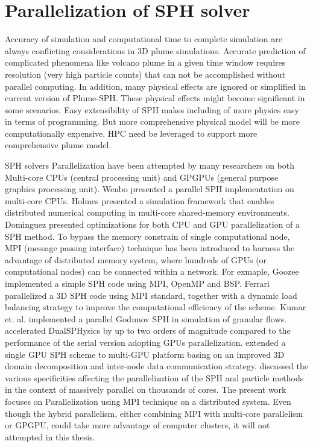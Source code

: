 \section{Parallelization of SPH solver}

Accuracy of simulation and computational time to complete simulation are always conflicting considerations in 3D plume simulations. Accurate prediction of complicated phenomena like volcano plume in a given time window requires resolution (very high particle counts) that can not be accomplished without parallel computing. In addition, many physical effects are ignored or simplified in current version of Plume-SPH. These physical effects might become significant in some scenarios. Easy extensibility of SPH makes including of more physics easy in terms of programming. But more comprehensive physical model will be more computationally expensive. HPC need be leveraged to support more comprehensive plume model.

SPH solvers Parallelization have been attempted by many researchers on both Multi-core CPUs (central processing unit) and GPGPUs (general purpose graphics processing unit). Wenbo \cite{wenbo2014performance} presented a parallel SPH implementation on multi-core CPUs. Holmes \cite{holmes2011framework} presented a simulation framework that enables distributed numerical computing in multi-core shared-memory environments. Dominguez \cite{dominguez2011optimization} presented optimizations for both CPU and GPU parallelization of a SPH method. To bypass the memory constrain of single computational node, MPI (message passing interface) technique has been introduced to harness the advantage of distributed memory system, where hundreds of GPUs (or computational nodes) can be connected within a network. For exmaple, Goozee \cite{goozee2003distributed} implemented a simple SPH code using MPI, OpenMP and BSP. 
Ferrari \cite{ferrari2009new} parallelized a 3D SPH code using MPI standard, together with a dynamic load balancing strategy to improve the computational efficiency of the scheme. Kumar et. al. \cite{kumar2013parallel} implemented a parallel Godunov SPH in simulation of granular flows. \citet{crespo2015dualsphysics} accelerated DualSPHysics by up to two orders of magnitude compared to the performance of the serial version adopting GPUs parallelization. \citet{ji2016large} 
extended a single GPU SPH scheme to multi-GPU platform basing on an improved 3D domain decomposition and inter-node data communication strategy. \citet{oger2016distributed} discussed the various specificities affecting the parallelization of the SPH and particle methods in the context of massively parallel on thousands of cores.
The present work focuses on Parallelization using MPI technique on a distributed system. Even though the hybrid parallelism, either combining MPI with multi-core parallelism or GPGPU, could take more advantage of computer clusters, it will not attempted in this thesis.

